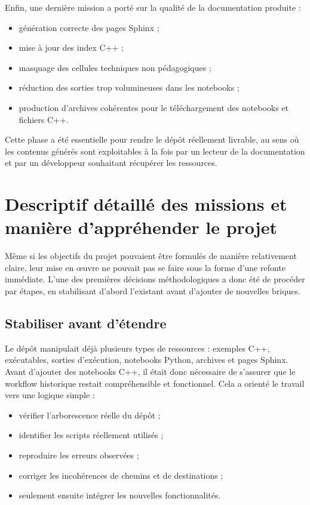 \documentclass[a4paper,12pt,twoside]{article}
\begin{document}
Enfin, une dernière mission a porté sur la qualité de la documentation produite :
\begin{itemize}
    \item génération correcte des pages Sphinx ;
    \item mise à jour des index C++ ;
    \item masquage des cellules techniques non pédagogiques ;
    \item réduction des sorties trop volumineuses dans les notebooks ;
    \item production d'archives cohérentes pour le téléchargement des notebooks et fichiers C++.
\end{itemize}

Cette phase a été essentielle pour rendre le dépôt réellement livrable, au sens où les contenus générés sont exploitables à la fois par un lecteur de la documentation et par un développeur souhaitant récupérer les ressources.

\section{Descriptif détaillé des missions et manière d'appréhender le projet}

Même si les objectifs du projet pouvaient être formulés de manière relativement claire, leur mise en œuvre ne pouvait pas se faire sous la forme d'une refonte immédiate. L'une des premières décisions méthodologiques a donc été de procéder par étapes, en stabilisant d'abord l'existant avant d'ajouter de nouvelles briques.

\subsection{Stabiliser avant d'étendre}

Le dépôt manipulait déjà plusieurs types de ressources : exemples C++, exécutables, sorties d'exécution, notebooks Python, archives et pages Sphinx. Avant d'ajouter des notebooks C++, il était donc nécessaire de s'assurer que le workflow historique restait compréhensible et fonctionnel. Cela a orienté le travail vers une logique simple :
\begin{itemize}
    \item vérifier l'arborescence réelle du dépôt ;
    \item identifier les scripts réellement utilisés ;
    \item reproduire les erreurs observées ;
    \item corriger les incohérences de chemins et de destinations ;
    \item seulement ensuite intégrer les nouvelles fonctionnalités.
\end{itemize}
\end{document}
